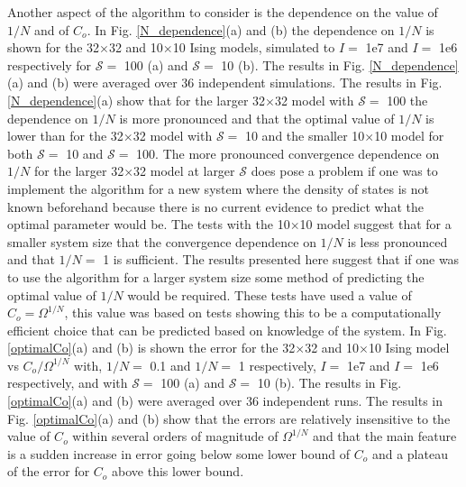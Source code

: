 \documentclass[aps,pre,reprint,superscriptaddress,showkeys]{revtex4-2}
\begin{document}
Another aspect of the algorithm to consider is the dependence on the value of $1/N$ and of $C_{o}$. In Fig. \ref{N_dependence}(a) and (b) the dependence on $1/N$ is shown for  the 32$\times$32  and  10$\times$10 Ising models, simulated to $I=$ 1e7 and $I=$ 1e6 respectively for $\mathcal{S}=$ 100  (a) and $\mathcal{S}=$ 10  (b). The results in Fig. \ref{N_dependence}(a) and (b) were averaged over 36 independent simulations. The results in Fig. \ref{N_dependence}(a) show that for the larger 32$\times$32 model with $\mathcal{S}=$ 100 the dependence on $1/N$ is more pronounced and that the optimal value of $1/N$ is lower than for the  32$\times$32 model with $\mathcal{S}=$ 10 and the  smaller 10$\times$10 model for both $\mathcal{S}=$ 10 and $\mathcal{S}=$ 100. The more pronounced convergence dependence on $1/N$ for the larger 32$\times$32 model at larger $\mathcal{S}$ does pose a problem if one was to implement the  algorithm for a new system where the density of states is not known beforehand because there is no current evidence to predict what the optimal parameter would be.  The tests with the 10$\times$10 model suggest that for a smaller system size that the convergence dependence on $1/N$ is less pronounced and that $1/N=$ 1 is sufficient. The results presented here suggest that if one was to use the algorithm for a larger system size some method of predicting the optimal value of $1/N$ would be required. These tests have used a value of $C_{o}=\Omega^{1/N}$, this value was based on tests showing this to be a computationally efficient choice that can be predicted based on knowledge of the system. In Fig. \ref{optimalCo}(a) and (b)  is shown the error for the 32$\times$32 and 10$\times$10   Ising model vs $C_{o}/\Omega^{1/N}$ with, $1/N=$ 0.1 and $1/N=$ 1 respectively, $I=$ 1e7 and $I=$ 1e6 respectively, and with $\mathcal{S}=$ 100  (a) and $\mathcal{S}=$ 10  (b). The results in Fig. \ref{optimalCo}(a) and (b) were averaged over 36 independent runs. The results in Fig. \ref{optimalCo}(a) and (b)  show that the errors are relatively insensitive to the value of $C_{o}$ within several orders of magnitude of $\Omega^{1/N}$ and that the main feature is a sudden increase in error going below some lower bound of $C_{o}$ and a plateau of the error for $C_{o}$ above this lower bound. 
\end{document}
